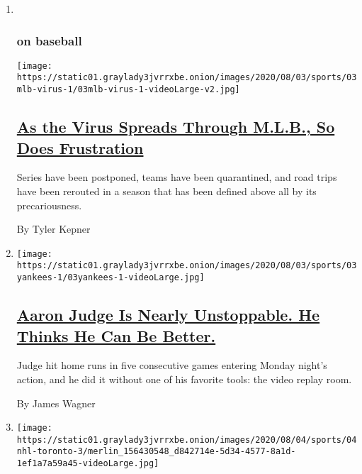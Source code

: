 \begin{enumerate}
\def\labelenumi{\arabic{enumi}.}
\item ~
  \hypertarget{on-baseball}{%
  \subsubsection{on baseball}\label{on-baseball}}

  \texttt{[image: https://static01.graylady3jvrrxbe.onion/images/2020/08/03/sports/03mlb-virus-1/03mlb-virus-1-videoLarge-v2.jpg]}

  \hypertarget{as-the-virus-spreads-through-mlb-so-does-frustration}{%
  \subsection{\texorpdfstring{\href{/2020/08/03/sports/baseball/mlb-coronavirus-outbreak.html}{As
  the Virus Spreads Through M.L.B., So Does
  Frustration}}{As the Virus Spreads Through M.L.B., So Does Frustration}}\label{as-the-virus-spreads-through-mlb-so-does-frustration}}

  Series have been postponed, teams have been quarantined, and road
  trips have been rerouted in a season that has been defined above all
  by its precariousness.

  By Tyler Kepner
\item
  \texttt{[image: https://static01.graylady3jvrrxbe.onion/images/2020/08/03/sports/03yankees-1/03yankees-1-videoLarge.jpg]}

  \hypertarget{aaron-judge-is-nearly-unstoppable-he-thinks-he-can-be-better}{%
  \subsection{\texorpdfstring{\href{/2020/08/03/sports/baseball/aaron-judge-yankees.html}{Aaron
  Judge Is Nearly Unstoppable. He Thinks He Can Be
  Better.}}{Aaron Judge Is Nearly Unstoppable. He Thinks He Can Be Better.}}\label{aaron-judge-is-nearly-unstoppable-he-thinks-he-can-be-better}}

  Judge hit home runs in five consecutive games entering Monday night's
  action, and he did it without one of his favorite tools: the video
  replay room.

  By James Wagner
\item
  \texttt{[image: https://static01.graylady3jvrrxbe.onion/images/2020/08/04/sports/04nhl-toronto-3/merlin\_156430548\_d842714e-5d34-4577-8a1d-1ef1a7a59a45-videoLarge.jpg]}


\end{enumerate}
